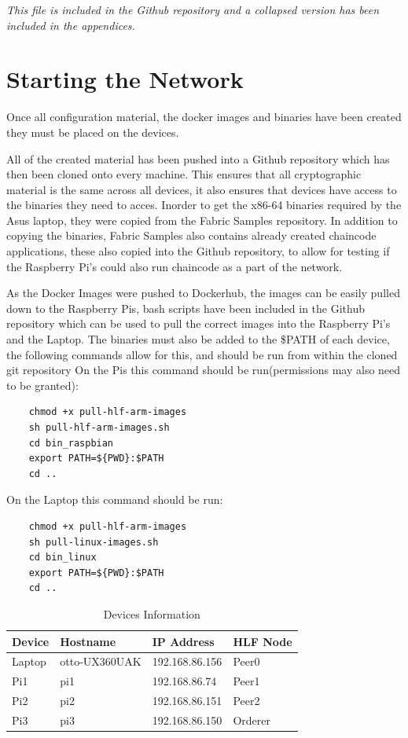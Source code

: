 \textit{This file is included in the Github repository and a collapsed version has been included in the appendices. }

\section{Starting the Network}

Once all configuration material, the docker images and binaries have been created they must be placed on the devices. 

All of the created material has been pushed into a Github repository which has then been cloned onto every machine. This ensures that all cryptographic material is the same across all devices, it also ensures that devices have access to the binaries they need to acces. Inorder to get the x86-64 binaries required by the Asus laptop, they were copied from the Fabric Samples repository. In addition to copying the binaries, Fabric Samples also contains already created chaincode applications, these also copied into the Github repository, to allow for testing if the Raspberry Pi's could also run chaincode as a part of the network.

As the Docker Images were pushed to Dockerhub, the images can be easily pulled down to the Raspberry Pis, bash scripts have been included in the Github repository which can be used to pull the correct images into the Raspberry Pi's and the Laptop.
The binaries must also be added to the \$PATH of each device, the following commands allow for this, and should be run from within the cloned git repository
On the Pis this command should be run(permissions may also need to be granted):
\begin{verbatim}
    chmod +x pull-hlf-arm-images
    sh pull-hlf-arm-images.sh
    cd bin_raspbian
    export PATH=${PWD}:$PATH
    cd ..
\end{verbatim}
On the Laptop this command should be run:
\begin{verbatim}
    chmod +x pull-hlf-arm-images
    sh pull-linux-images.sh
    cd bin_linux
    export PATH=${PWD}:$PATH
    cd ..
\end{verbatim}


\begin{table}[h]
\caption{Devices Information}
\begin{tabular}{|p{3cm}|p{3cm}|p{3cm}|p{3cm}|}
\hline
Device & Hostname      & IP Address     & HLF Node \\ [10pt] \hline
Laptop & otto-UX360UAK & 192.168.86.156 & Peer0    \\ [10pt] \hline
Pi1    & pi1           & 192.168.86.74  & Peer1    \\ [10pt] \hline
Pi2    & pi2           & 192.168.86.151 & Peer2    \\ [10pt] \hline
Pi3    & pi3           & 192.168.86.150 & Orderer  \\ [10pt] \hline
\end{tabular}
\end{table}


